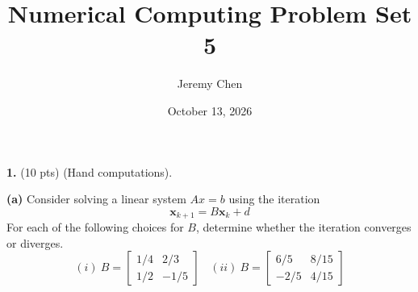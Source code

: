 \documentclass[10pt,letterpaper]{article}
\title{Numerical Computing Problem Set 5}
\author{Jeremy Chen}
\date{October 13, 2026}
\begin{document}
	\maketitle

\noindent\textbf{1.} (10 pts) (Hand computations).

\hfill

\noindent\textbf{(a)} Consider solving a linear system $Ax = b$ using the iteration
$$\textbf{x}_{k + 1} = B\textbf{x}_{k} + d$$
For each of the following choices for $B$, determine whether the iteration converges or diverges.
$$(i)\ B = \begin{bmatrix}
1/4 & 2/3 \\
1/2 & -1/5 
\end{bmatrix}\ \ \ \ (ii)\ B = \begin{bmatrix}
6/5 & 8/15 \\
-2/5 & 4/15 
\end{bmatrix}$$
\end{document}

